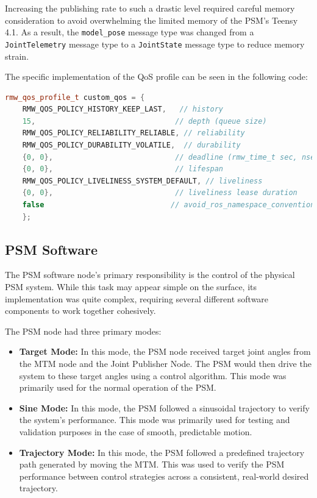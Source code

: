 Increasing the publishing rate to such a drastic level required careful memory consideration to avoid overwhelming the limited memory of the PSM's Teensy 4.1. As a result, the \texttt{model\_pose} message type was changed from a \texttt{JointTelemetry} message type to a \texttt{JointState} message type to reduce memory strain.

The specific implementation of the QoS profile can be seen in the following code:

\begin{lstlisting}[language=C++, caption={Custom QoS Profile Definition}, label={lst:custom_qos_profile}]
    rmw_qos_profile_t custom_qos = {
    RMW_QOS_POLICY_HISTORY_KEEP_LAST,   // history
    15,                                // depth (queue size)
    RMW_QOS_POLICY_RELIABILITY_RELIABLE, // reliability
    RMW_QOS_POLICY_DURABILITY_VOLATILE,  // durability
    {0, 0},                            // deadline (rmw_time_t sec, nsec)
    {0, 0},                            // lifespan
    RMW_QOS_POLICY_LIVELINESS_SYSTEM_DEFAULT, // liveliness
    {0, 0},                            // liveliness lease duration
    false                             // avoid_ros_namespace_conventions
    };
\end{lstlisting}

\subsection{PSM Software}

The PSM software node's primary responsibility is the control of the physical PSM system. While this task may appear simple on the surface, its implementation was quite complex, requiring several different software components to work together cohesively.

The PSM node had three primary modes:

\begin{itemize}
    \item \textbf{Target Mode:} In this mode, the PSM node received target joint angles from the MTM node and the Joint Publisher Node. The PSM would then drive the system to these target angles using a control algorithm. This mode was primarily used for the normal operation of the PSM.
    \item \textbf{Sine Mode:} In this mode, the PSM followed a sinusoidal trajectory to verify the system's performance. This mode was primarily used for testing and validation purposes in the case of smooth, predictable motion.
    \item \textbf{Trajectory Mode:} In this mode, the PSM followed a predefined trajectory path generated by moving the MTM. This was used to verify the PSM performance between control strategies across a consistent, real-world desired trajectory.
\end{itemize}

